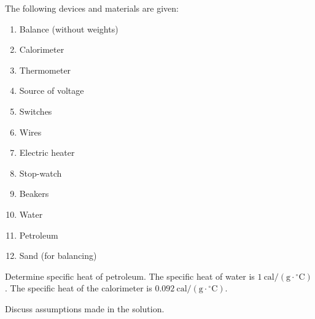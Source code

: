 The following devices and materials are given:
\begin{enumerate}\itemsep0pt
  \item Balance (without weights)
  \item Calorimeter
  \item Thermometer
  \item Source of voltage
  \item Switches
  \item Wires
  \item Electric heater
  \item Stop-watch
  \item Beakers
  \item Water
  \item Petroleum
  \item Sand (for balancing)
\end{enumerate}
Determine specific heat of petroleum. The specific heat of water is
$1~\mathrm{cal/(g\cdot{}^\circ C)}$. The specific heat of the calorimeter is
$0.092~\mathrm{cal/(g\cdot{}^\circ C)}$.

Discuss assumptions made in the solution.
